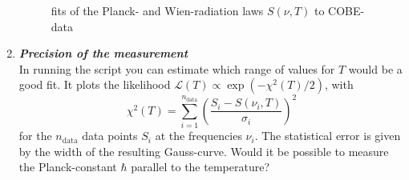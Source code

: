 \documentclass[a4paper,12pt]{article}
\newcommand{\question}[1]{\textbf{\textit{#1}}}
\begin{document}
\begin{enumerate}
\begin{figure}[h]
\begin{center}
\caption{fits of the Planck- and Wien-radiation laws $S(\nu,T)$ to COBE-data}
\end{center}
\end{figure}

\item \question{Precision of the measurement}\\
In running the script  you can estimate which range of values for $T$ would be a good fit. It plots the likelihood $\mathcal{L}(T)\propto \exp(-\chi^2(T)/2)$, with 
\begin{equation}
\chi^2(T) = \sum_{i=1}^{n_\mathrm{data}}\left(\frac{S_i-S(\nu_i,T)}{\sigma_i}\right)^2
\end{equation}
for the $n_\mathrm{data}$ data points $S_i$ at the frequencies $\nu_i$. The statistical error is given by the width of the resulting Gauss-curve. Would it be possible to measure the Planck-constant $\hbar$ parallel to the temperature?


\end{enumerate}
\end{document}
